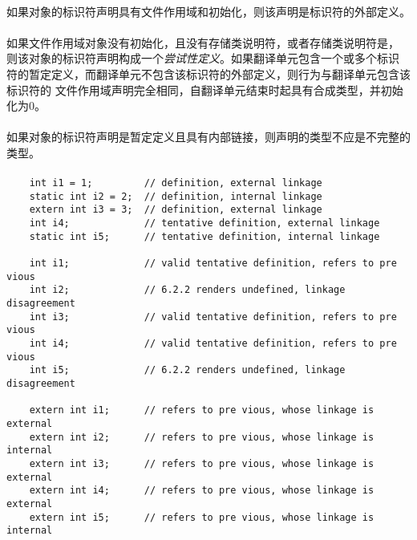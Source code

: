 {                                             
\semantic
\paragraph{}
如果对象的标识符声明具有文件作用域和初始化，则该声明是标识符的外部定义。

\paragraph{}
如果文件作用域对象没有初始化，且没有存储类说明符，或者存储类说明符是，
则该对象的标识符声明构成一个\textit{尝试性定义}。如果翻译单元包含一个或多个标识
符的暂定定义，而翻译单元不包含该标识符的外部定义，则行为与翻译单元包含该标识符的
文件作用域声明完全相同，自翻译单元结束时起具有合成类型，并初始化为0。

\paragraph{}
如果对象的标识符声明是暂定定义且具有内部链接，则声明的类型不应是不完整的类型。

\paragraph{}
\ex
\begin{lstlisting}
    int i1 = 1;         // definition, external linkage
    static int i2 = 2;  // definition, internal linkage
    extern int i3 = 3;  // definition, external linkage
    int i4;             // tentative definition, external linkage
    static int i5;      // tentative definition, internal linkage

    int i1;             // valid tentative definition, refers to pre vious
    int i2;             // 6.2.2 renders undefined, linkage disagreement
    int i3;             // valid tentative definition, refers to pre vious
    int i4;             // valid tentative definition, refers to pre vious
    int i5;             // 6.2.2 renders undefined, linkage disagreement

    extern int i1;      // refers to pre vious, whose linkage is external
    extern int i2;      // refers to pre vious, whose linkage is internal
    extern int i3;      // refers to pre vious, whose linkage is external
    extern int i4;      // refers to pre vious, whose linkage is external
    extern int i5;      // refers to pre vious, whose linkage is internal
\end{lstlisting}

}
